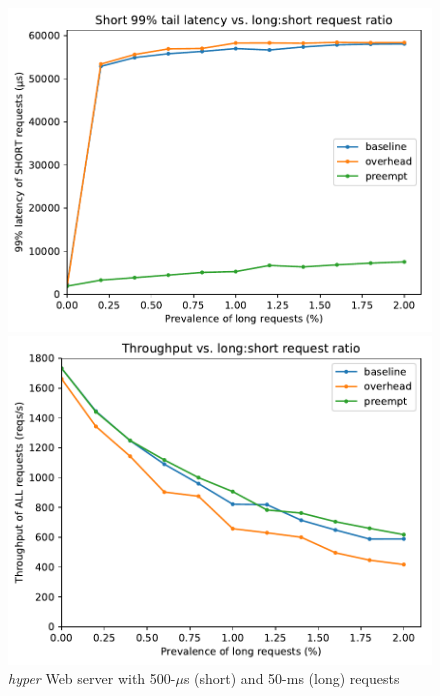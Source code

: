 \begin{figure}
	\begin{minipage}{\columnwidth}
	\includegraphics[width=\textwidth]{figs/twooom_99-short}
	\end{minipage}
%
	\begin{minipage}{\columnwidth}
	\includegraphics[width=\textwidth]{figs/twooom_tput}
	\end{minipage}
\caption{\textit{hyper} Web server with 500-$\mu$s (short) and 50-ms (long) requests}
\label{fig:hyper}
\end{figure}

